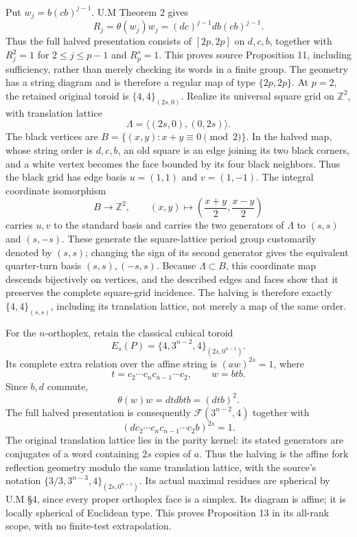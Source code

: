 Put \(w_j=b(cb)^{j-1}\). U.M Theorem 2 gives
\[
 R_j=\theta(w_j)w_j=(dc)^{j-1}db(cb)^{j-1}.
\]
Thus the full halved presentation consists of \([2p,2p]\) on \(d,c,b\), together with \(R_j^2=1\) for \(2\le j\le p-1\) and \(R_p^s=1\). This proves source Proposition 11, including sufficiency, rather than merely checking its words in a finite group. The geometry has a string diagram and is therefore a regular map of type \(\{2p,2p\}\). At \(p=2\), the retained original toroid is \(\{4,4\}_{(2s,0)}\). Realize its universal square grid on $\mathbb Z^2$, with translation lattice
\[
\Lambda=\langle(2s,0),(0,2s)\rangle.
\]
The black vertices are $B=\{(x,y):x+y\equiv0\pmod2\}$. In the halved map, whose string order is $d,c,b$, an old square is an edge joining its two black corners, and a white vertex becomes the face bounded by its four black neighbors. Thus the black grid has edge basis $u=(1,1)$ and $v=(1,-1)$. The integral coordinate isomorphism
\[
 B\longrightarrow\mathbb Z^2,\qquad
 (x,y)\longmapsto\left(\frac{x+y}{2},\frac{x-y}{2}\right)
\]
carries $u,v$ to the standard basis and carries the two generators of $\Lambda$ to $(s,s)$ and $(s,-s)$. These generate the square-lattice period group customarily denoted by $(s,s)$; changing the sign of its second generator gives the equivalent quarter-turn basis $(s,s),(-s,s)$. Because $\Lambda\subset B$, this coordinate map descends bijectively on vertices, and the described edges and faces show that it preserves the complete square-grid incidence. The halving is therefore exactly \(\{4,4\}_{(s,s)}\), including its translation lattice, not merely a map of the same order.

For the \(n\)-orthoplex, retain the classical cubical toroid
\[
 E_s(P)=\{4,3^{n-2},4\}_{(2s,0^{n-1})}.
\]
Its complete extra relation over the affine string is \((aw)^{2s}=1\), where
\[
 t=c_2\cdots c_n c_{n-1}\cdots c_2,\qquad w=btb.
\]
Since \(b,d\) commute,
\[
 \theta(w)w=dtdbtb=(dtb)^2.
\]
The full halved presentation is consequently \(\mathcal F(3^{n-2},4)\) together with
\[
 (d c_2\cdots c_n c_{n-1}\cdots c_2 b)^{2s}=1. \tag{4}
\]
The original translation lattice lies in the parity kernel: its stated generators are conjugates of a word containing \(2s\) copies of \(a\). Thus the halving is the affine fork reflection geometry modulo the same translation lattice, with the source's notation \(\{3/3,3^{n-3},4\}_{(2s,0^{n-1})}\). Its actual maximal residues are spherical by U.M §4, since every proper orthoplex face is a simplex. Its diagram is affine; it is locally spherical of Euclidean type. This proves Proposition 13 in its all-rank scope, with no finite-test extrapolation.


